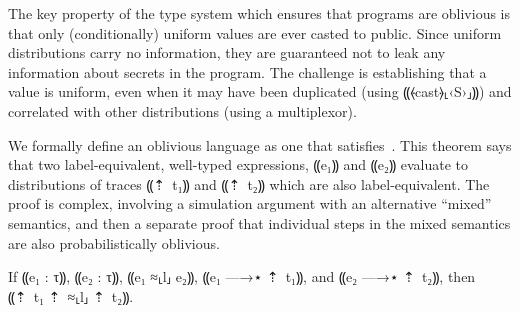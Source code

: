 The key property of the type system which ensures that programs are oblivious is that only (conditionally) uniform
values are ever casted to public. Since uniform distributions carry no information, they are guaranteed not to leak
any information about secrets in the program. The challenge is establishing that a value is uniform, even when it may
have been duplicated (using ⸨⦑cast⦒⸤‹S›⸥⸩) and correlated with other distributions (using a multiplexor).

We formally define an oblivious language as one that satisfies~. This theorem says that two label-equivalent,
well-typed expressions, ⸨e₁⸩ and ⸨e₂⸩ evaluate to distributions of traces ⸨⇡~{t₁}⸩ and ⸨⇡~{t₂}⸩ which are also label-equivalent.
The proof is complex, involving a simulation argument with an alternative ``mixed'' semantics, and then a separate proof that
individual steps in the mixed semantics are also probabilistically oblivious.

\begin{theorem}[PMTO] \label{thm:obliv-pmto}
  If ⸨e₁ : τ⸩, ⸨e₂ : τ⸩, ⸨e₁ ≈⸤l⸥ e₂⸩, ⸨e₁ —→⋆ ⇡~{t₁}⸩, and ⸨e₂ —→⋆ ⇡~{t₂}⸩, then ⸨⇡~{t₁} ⇡~≈⸤l⸥ ⇡~{t₂}⸩.
\end{theorem}
